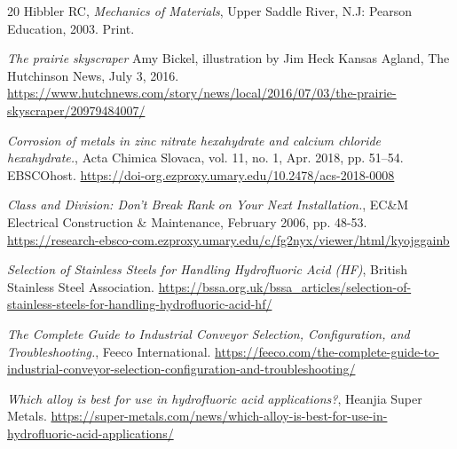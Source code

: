 \documentclass[10pt]{project}
\begin{document}
\begin{thebibliography}{20}
%
 Hibbler RC, {\it Mechanics of Materials}, Upper Saddle River, N.J: Pearson Education, 2003. Print.
%

 {\it The prairie skyscraper} Amy Bickel, illustration by Jim Heck Kansas Agland, The Hutchinson News, July 3, 2016.
\url{https://www.hutchnews.com/story/news/local/2016/07/03/the-prairie-skyscraper/20979484007/}

 {\it Corrosion of metals in zinc nitrate hexahydrate and calcium chloride hexahydrate.}, Acta Chimica Slovaca, vol. 11, no. 1, Apr. 2018, pp. 51–54. EBSCOhost. 
\url{https://doi-org.ezproxy.umary.edu/10.2478/acs-2018-0008}

 {\it Class and Division: Don't Break Rank on Your Next Installation.},  EC\&M Electrical Construction \& Maintenance, February 2006, pp. 48-53. 
\url{https://research-ebsco-com.ezproxy.umary.edu/c/fg2nyx/viewer/html/kyojggainb}



 {\it Selection of Stainless Steels for Handling Hydrofluoric Acid (HF)}, British Stainless Steel Association. 
\url{https://bssa.org.uk/bssa_articles/selection-of-stainless-steels-for-handling-hydrofluoric-acid-hf/}

 {\it The Complete Guide to Industrial Conveyor Selection, Configuration, and Troubleshooting.}, Feeco International. 
\url{https://feeco.com/the-complete-guide-to-industrial-conveyor-selection-configuration-and-troubleshooting/}

 {\it Which alloy is best for use in hydrofluoric acid applications?}, Heanjia Super Metals. 
\url{https://super-metals.com/news/which-alloy-is-best-for-use-in-hydrofluoric-acid-applications/}




\end{thebibliography}
\end{document}
